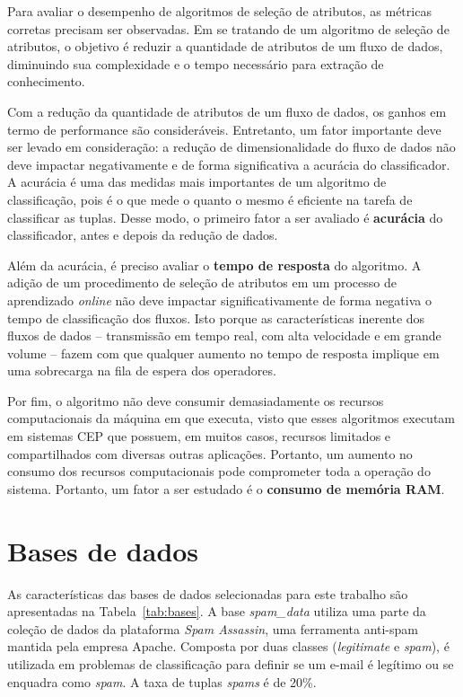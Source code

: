 Para avaliar o desempenho de algoritmos de seleção de atributos, as métricas corretas precisam ser observadas. Em se tratando de um algoritmo de seleção de atributos, o objetivo é reduzir a quantidade de atributos de um fluxo de dados, diminuindo sua complexidade e o tempo necessário para extração de conhecimento.

Com a redução da quantidade de atributos de um fluxo de dados, os ganhos em termo de performance são consideráveis. Entretanto, um fator importante deve ser levado em consideração: a redução de dimensionalidade do fluxo de dados não deve impactar negativamente e de forma significativa a acurácia do classificador. A acurácia é uma das medidas mais importantes de um algoritmo de classificação, pois é o que mede o quanto o mesmo é eficiente na tarefa de classificar as tuplas. Desse modo, o primeiro fator a ser avaliado é \textbf{acurácia} do classificador, antes e depois da redução de dados. 

Além da acurácia, é preciso avaliar o \textbf{tempo de resposta} do algoritmo. A adição de um procedimento de seleção de atributos em um processo de aprendizado \textit{online} não deve impactar significativamente de forma negativa o tempo de classificação dos fluxos. Isto porque
as características inerente dos fluxos de dados -- transmissão em tempo real, com alta velocidade e em grande volume -- fazem com que qualquer aumento no tempo de resposta  implique em uma sobrecarga na fila de espera dos operadores. 

Por fim, o algoritmo não deve consumir demasiadamente os recursos computacionais da máquina em que executa, visto que esses algoritmos executam em sistemas CEP que possuem, em muitos casos, recursos limitados e compartilhados com diversas outras aplicações. Portanto, um aumento no consumo dos recursos computacionais pode comprometer toda a operação do sistema. Portanto, um fator a ser estudado é o \textbf{consumo de memória RAM}.

\section{Bases de dados}\label{sec:met_bases} 
As características das bases de dados selecionadas para este trabalho são apresentadas na Tabela~\ref{tab:bases}. A base \textit{spam\_data} utiliza uma parte da coleção de dados da plataforma \textit{Spam Assassin}, uma ferramenta anti-spam mantida pela empresa Apache. Composta por duas classes (\textit{legitimate} e \textit{spam}), é utilizada em problemas de classificação para definir se um e-mail é legítimo ou se enquadra como \textit{spam}. A taxa de tuplas \textit{spams} é de 20\%. 

